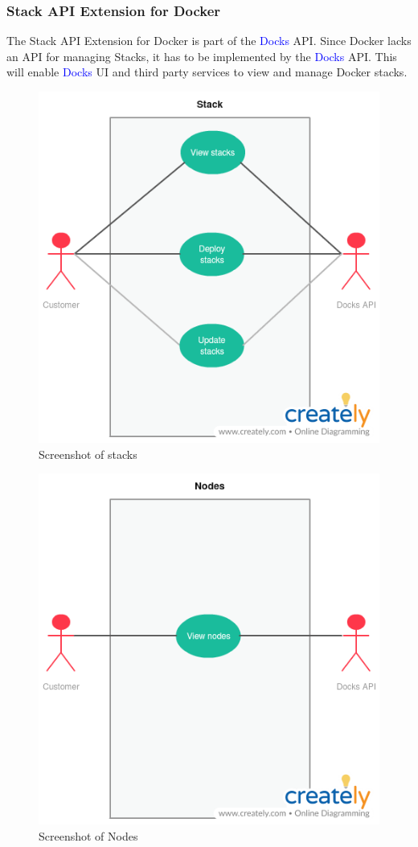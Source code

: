 \documentclass[]{article}
\newcommand{\docks}{\textcolor{Blue}{Docks} }
\newcommand{\docker}{Docker }
\begin{document}
\subsubsection{Stack API Extension for Docker}
The Stack API Extension for \docker is part of the \docks API.
Since \docker lacks an API for managing Stacks, it has to be implemented
by the \docks API. This will enable \docks UI and third party services
to view and manage \docker stacks.

\begin{figure}[H]
	\centering
	\includegraphics[scale=0.5]{uml/stacks.png}
	\caption{Screenshot of stacks}
\end{figure}

\begin{figure}[H]
	\centering
	\includegraphics[scale=0.5]{uml/nodes.png}
	\caption{Screenshot of Nodes}
\end{figure}
\end{document}
